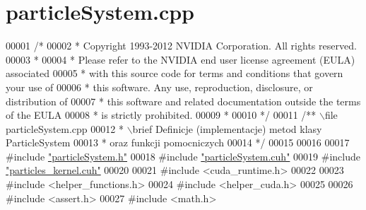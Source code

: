 \hypertarget{particle_system_8cpp_source}{\section{particle\-System.\-cpp}
}

\begin{DoxyCode}
00001 \textcolor{comment}{/*}
00002 \textcolor{comment}{ * Copyright 1993-2012 NVIDIA Corporation.  All rights reserved.}
00003 \textcolor{comment}{ *}
00004 \textcolor{comment}{ * Please refer to the NVIDIA end user license agreement (EULA) associated}
00005 \textcolor{comment}{ * with this source code for terms and conditions that govern your use of}
00006 \textcolor{comment}{ * this software. Any use, reproduction, disclosure, or distribution of}
00007 \textcolor{comment}{ * this software and related documentation outside the terms of the EULA}
00008 \textcolor{comment}{ * is strictly prohibited.}
00009 \textcolor{comment}{ *}
00010 \textcolor{comment}{ */}
00011  \textcolor{comment}{/** \(\backslash\)file particleSystem.cpp}
00012 \textcolor{comment}{  * \(\backslash\)brief Definicje (implementacje) metod klasy ParticleSystem}
00013 \textcolor{comment}{  * oraz funkcji pomocniczych}
00014 \textcolor{comment}{  */}
00015 
00016 
00017 \textcolor{preprocessor}{#}\textcolor{preprocessor}{include} \hyperlink{particle_system_8h}{"particleSystem.h"}
00018 \textcolor{preprocessor}{#}\textcolor{preprocessor}{include} \hyperlink{particle_system_8cuh}{"particleSystem.cuh"}
00019 \textcolor{preprocessor}{#}\textcolor{preprocessor}{include} \hyperlink{particles__kernel_8cuh}{"particles\_kernel.cuh"}
00020 
00021 \textcolor{preprocessor}{#}\textcolor{preprocessor}{include} \textcolor{preprocessor}{<}\textcolor{preprocessor}{cuda\_runtime}\textcolor{preprocessor}{.}\textcolor{preprocessor}{h}\textcolor{preprocessor}{>}
00022 
00023 \textcolor{preprocessor}{#}\textcolor{preprocessor}{include} \textcolor{preprocessor}{<}\textcolor{preprocessor}{helper\_functions}\textcolor{preprocessor}{.}\textcolor{preprocessor}{h}\textcolor{preprocessor}{>}
00024 \textcolor{preprocessor}{#}\textcolor{preprocessor}{include} \textcolor{preprocessor}{<}\textcolor{preprocessor}{helper\_cuda}\textcolor{preprocessor}{.}\textcolor{preprocessor}{h}\textcolor{preprocessor}{>}
00025 
00026 \textcolor{preprocessor}{#}\textcolor{preprocessor}{include} \textcolor{preprocessor}{<}\textcolor{preprocessor}{assert}\textcolor{preprocessor}{.}\textcolor{preprocessor}{h}\textcolor{preprocessor}{>}
00027 \textcolor{preprocessor}{#}\textcolor{preprocessor}{include} \textcolor{preprocessor}{<}\textcolor{preprocessor}{math}\textcolor{preprocessor}{.}\textcolor{preprocessor}{h}\textcolor{preprocessor}{>}

\end{DoxyCode}
